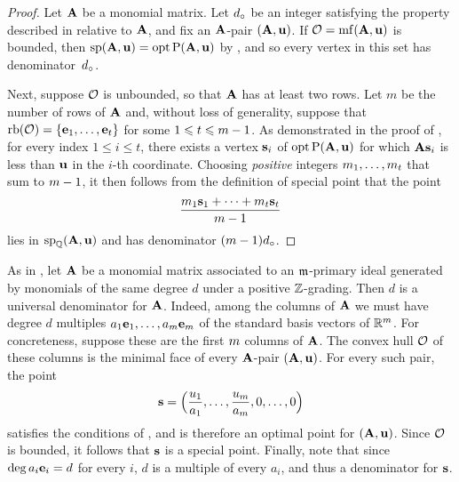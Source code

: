 \documentclass{amsart}
\begin{document}
\begin{proof}
   Let $\mathbf{A}$ be a monomial matrix.
   Let $d_{\circ}$ be an integer satisfying the property described in  relative to $\mathbf{A}$, and fix an $\mathbf{A}$-pair $(\mathbf{A}, \mathbf{u})$.
   If $\mathcal{O} = \operatorname{mf}(\mathbf{A}, \mathbf{u})$ is bounded, then $\operatorname{sp}(\mathbf{A}, \mathbf{u}) = \operatorname{opt} \mathrm{P}(\mathbf{A}, \mathbf{u})$ by , and so every vertex in this set has denominator~$d_{\circ}$.

   Next, suppose $\mathcal{O}$ is unbounded, so that $\mathbf{A}$ has at least two rows.
   Let $m$ be the number of rows of $\mathbf{A}$ and, without loss of generality, suppose that $\operatorname{rb}(\mathcal{O}) = \{ \mathbf{e}_1, \ldots, \mathbf{e}_t \}$ for some $1 \leqslant t \leqslant m-1$.
   As demonstrated in the  proof of , for every index  $1 \leq i \leq t$, there exists a vertex $\mathbf{s}_i$ of $\operatorname{opt} \mathrm{P}(\mathbf{A}, \mathbf{u})$ for which $\mathbf{A} \mathbf{s}_i$ is less than $\mathbf{u}$ in the $i$-th coordinate.
   Choosing \emph{positive} integers $m_1, \ldots, m_t$ that sum to $m-1$, it then follows from the definition of special point that the point
   \[ \frac{ m_1 \mathbf{s}_1 + \cdots + m_t  \mathbf{s}_t}{m-1}  \]
   lies in $\operatorname{sp}_{\mathbb{Q}}(\mathbf{A}, \mathbf{u})$ and has denominator $(m-1)d_{\circ}$.
\end{proof}

\begin{example}
   \label{ex: m-primary homogeneous case 2}
   As in , let $\mathbf{A}$ be a monomial matrix associated to an $\mathfrak{m}$-primary ideal generated by monomials of the same degree $d$ under a positive $\mathbb{Z}$-grading.
   Then $d$ is a universal denominator for $\mathbf{A}$.
   Indeed, among the columns of $\mathbf{A}$ we must have degree $d$ multiples $a_1\mathbf{e}_1,\ldots,a_m\mathbf{e}_m$ of the standard basis vectors of $\mathbb{R}^m$.
   For concreteness, suppose these are the first $m$ columns of $\mathbf{A}$.
   The convex hull $\mathcal{O}$ of these columns is the minimal face of every $\mathbf{A}$-pair $(\mathbf{A},\mathbf{u})$.
   For every such pair, the point
   \[\mathbf{s} = \Big(\frac{u_1}{a_1},\ldots,\frac{u_m}{a_m},0,\ldots,0\Big)\]
   satisfies the conditions of , and is therefore an optimal point for $(\mathbf{A},\mathbf{u})$.
   Since $\mathcal{O}$ is bounded, it follows that $\mathbf{s}$ is a special point.
   Finally, note that since $\deg a_i\mathbf{e}_i = d$ for every $i$, $d$ is a multiple of every $a_i$, and thus a denominator for $\mathbf{s}$.
\end{example}
\end{document}
